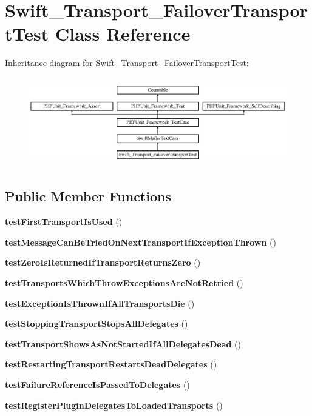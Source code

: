 \section{Swift\+\_\+\+Transport\+\_\+\+Failover\+Transport\+Test Class Reference}
\label{class_swift___transport___failover_transport_test}
Inheritance diagram for Swift\+\_\+\+Transport\+\_\+\+Failover\+Transport\+Test\+:\begin{figure}[H]
\begin{center}
\leavevmode
\includegraphics[height=3.905160cm]{class_swift___transport___failover_transport_test}
\end{center}
\end{figure}
\subsection*{Public Member Functions}
\begin{DoxyCompactItemize}
\item 
{\bf test\+First\+Transport\+Is\+Used} ()
\item 
{\bf test\+Message\+Can\+Be\+Tried\+On\+Next\+Transport\+If\+Exception\+Thrown} ()
\item 
{\bf test\+Zero\+Is\+Returned\+If\+Transport\+Returns\+Zero} ()
\item 
{\bf test\+Transports\+Which\+Throw\+Exceptions\+Are\+Not\+Retried} ()
\item 
{\bf test\+Exception\+Is\+Thrown\+If\+All\+Transports\+Die} ()
\item 
{\bf test\+Stopping\+Transport\+Stops\+All\+Delegates} ()
\item 
{\bf test\+Transport\+Shows\+As\+Not\+Started\+If\+All\+Delegates\+Dead} ()
\item 
{\bf test\+Restarting\+Transport\+Restarts\+Dead\+Delegates} ()
\item 
{\bf test\+Failure\+Reference\+Is\+Passed\+To\+Delegates} ()
\item 
{\bf test\+Register\+Plugin\+Delegates\+To\+Loaded\+Transports} ()
\end{DoxyCompactItemize}
